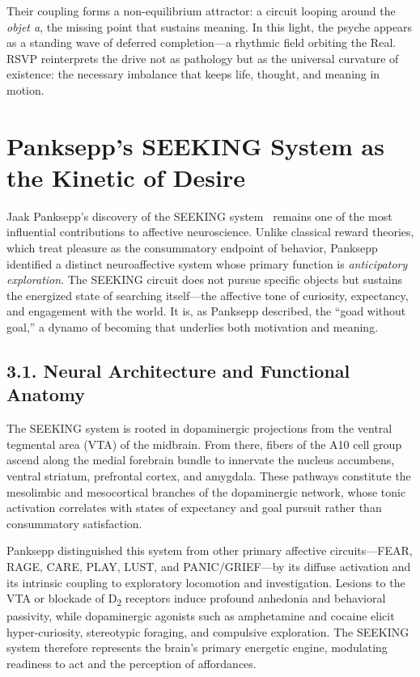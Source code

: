 \documentclass[12pt,a4paper]{article}
\begin{document}
Their coupling forms a non-equilibrium attractor: a circuit looping around the \emph{objet a}, the missing point that sustains meaning.  
In this light, the psyche appears as a standing wave of deferred completion—a rhythmic field orbiting the Real.  
RSVP reinterprets the drive not as pathology but as the universal curvature of existence: the necessary imbalance that keeps life, thought, and meaning in motion.

\section{Panksepp’s SEEKING System as the Kinetic of Desire}

Jaak Panksepp’s discovery of the \textsc{SEEKING} system~\citep{panksepp1998affective,panksepp2012archaeology} remains one of the most influential contributions to affective neuroscience.  
Unlike classical reward theories, which treat pleasure as the consummatory endpoint of behavior, Panksepp identified a distinct neuroaffective system whose primary function is \emph{anticipatory exploration}.  
The \textsc{SEEKING} circuit does not pursue specific objects but sustains the energized state of searching itself—the affective tone of curiosity, expectancy, and engagement with the world.  
It is, as Panksepp described, the “goad without goal,” a dynamo of becoming that underlies both motivation and meaning.

\subsection{3.1. Neural Architecture and Functional Anatomy}

The \textsc{SEEKING} system is rooted in dopaminergic projections from the ventral tegmental area (VTA) of the midbrain.  
From there, fibers of the A10 cell group ascend along the medial forebrain bundle to innervate the nucleus accumbens, ventral striatum, prefrontal cortex, and amygdala.  
These pathways constitute the mesolimbic and mesocortical branches of the dopaminergic network, whose tonic activation correlates with states of expectancy and goal pursuit rather than consummatory satisfaction.

Panksepp distinguished this system from other primary affective circuits—\textsc{FEAR}, \textsc{RAGE}, \textsc{CARE}, \textsc{PLAY}, \textsc{LUST}, and \textsc{PANIC/GRIEF}—by its diffuse activation and its intrinsic coupling to exploratory locomotion and investigation.  
Lesions to the VTA or blockade of D\textsubscript{2} receptors induce profound anhedonia and behavioral passivity, while dopaminergic agonists such as amphetamine and cocaine elicit hyper-curiosity, stereotypic foraging, and compulsive exploration.  
The SEEKING system therefore represents the brain’s primary energetic engine, modulating readiness to act and the perception of affordances.
\end{document}
